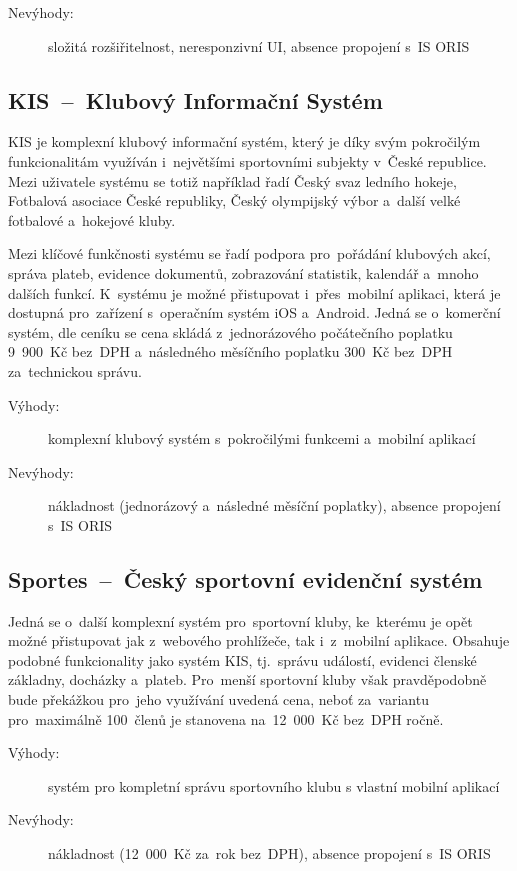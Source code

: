 \begin{description}
	\item[Nevýhody:] složitá rozšiřitelnost, neresponzivní UI, absence propojení s~IS ORIS
\end{description}

\subsection{KIS~–~Klubový Informační Systém}
KIS je komplexní klubový informační systém, který je díky svým pokročilým funkcionalitám využíván i~největšími sportovními subjekty v~České republice. Mezi uživatele systému se totiž například řadí Český svaz ledního hokeje, Fotbalová asociace České republiky, Český olympijský výbor a~další velké fotbalové a~hokejové kluby. \cite{esports, ceskyhokej}

Mezi klíčové funkčnosti systému se řadí podpora pro~pořádání klubových akcí, správa plateb, evidence dokumentů, zobrazování statistik, kalendář a~mnoho dalších funkcí. K~systému je možné přistupovat i~přes~mobilní aplikaci, která je dostupná pro~zařízení s~operačním systém iOS a~Android. Jedná se o~komerční systém, dle ceníku se cena skládá z~jednorázového počátečního poplatku 9~900~Kč bez~DPH a~následného měsíčního poplatku 300~Kč bez~DPH za~technickou správu. \cite{esports}

\begin{description}
	\item[Výhody:] komplexní klubový systém s~pokročilými funkcemi a~mobilní aplikací
	\item[Nevýhody:] nákladnost (jednorázový a~následné měsíční poplatky), absence propojení s~IS ORIS
\end{description}

\subsection{Sportes~–~Český sportovní evidenční systém}
Jedná se o~další komplexní systém pro~sportovní kluby, ke~kterému je opět možné přistupovat jak z~webového prohlížeče, tak i~z~mobilní aplikace. Obsahuje podobné funkcionality jako systém KIS, tj.~správu událostí, evidenci členské základny, docházky a~plateb. Pro~menší sportovní kluby však pravděpodobně bude překážkou pro~jeho využívání uvedená cena, neboť za~variantu pro~maximálně 100~členů je stanovena na~12~000~Kč bez~DPH ročně. \cite{sportes}

\begin{description}
	\item[Výhody:] systém pro kompletní správu sportovního klubu s vlastní mobilní aplikací
	\item[Nevýhody:] nákladnost (12~000~Kč za~rok bez~DPH), absence propojení s~IS ORIS
\end{description}

